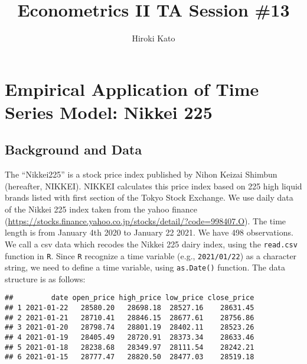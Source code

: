 \documentclass[
  12pt,
]{article}
\title{Econometrics II TA Session \#13}
\author{Hiroki Kato}
\date{}
\newenvironment{Shaded}{\begin{snugshade}}{\end{snugshade}}
\newcommand{\DataTypeTok}[1]{\textcolor[rgb]{0.13,0.29,0.53}{#1}}
\newcommand{\KeywordTok}[1]{\textcolor[rgb]{0.13,0.29,0.53}{\textbf{#1}}}
\newcommand{\NormalTok}[1]{#1}
\newcommand{\OperatorTok}[1]{\textcolor[rgb]{0.81,0.36,0.00}{\textbf{#1}}}
\newcommand{\OtherTok}[1]{\textcolor[rgb]{0.56,0.35,0.01}{#1}}
\newcommand{\StringTok}[1]{\textcolor[rgb]{0.31,0.60,0.02}{#1}}
\begin{document}
\maketitle

\hypertarget{empirical-application-of-time-series-model-nikkei-225}{%
\section{Empirical Application of Time Series Model: Nikkei
225}\label{empirical-application-of-time-series-model-nikkei-225}}

\hypertarget{background-and-data}{%
\subsection{Background and Data}\label{background-and-data}}

The ``Nikkei225'' is a stock price index published by Nihon Keizai
Shimbun (hereafter, NIKKEI). NIKKEI calculates this price index based on
225 high liquid brands listed with first section of the Tokyo Stock
Exchange. We use daily data of the Nikkei 225 index taken from the yahoo
finance
(\url{https://stocks.finance.yahoo.co.jp/stocks/detail/?code=998407.O}).
The time length is from January 4th 2020 to January 22 2021. We have 498
observations. We call a csv data which recodes the Nikkei 225 dairy
index, using the \texttt{read.csv} function in \texttt{R}. Since
\texttt{R} recognize a time variable (e.g., \texttt{2021/01/22}) as a
character string, we need to define a time variable, using
\texttt{as.Date()} function. The data structure is as follows:

\begin{Shaded}
\end{Shaded}

\begin{verbatim}
##         date open_price high_price low_price close_price
## 1 2021-01-22   28580.20   28698.18  28527.16    28631.45
## 2 2021-01-21   28710.41   28846.15  28677.61    28756.86
## 3 2021-01-20   28798.74   28801.19  28402.11    28523.26
## 4 2021-01-19   28405.49   28720.91  28373.34    28633.46
## 5 2021-01-18   28238.68   28349.97  28111.54    28242.21
## 6 2021-01-15   28777.47   28820.50  28477.03    28519.18
\end{verbatim}
\end{document}
